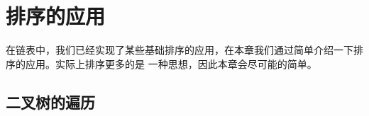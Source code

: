 \documentclass[../../main.tex]{subfiles}
\begin{document}
\setchapterpreamble[u]{\margintoc}

\chapter{排序的应用}

在链表中，我们已经实现了某些基础排序的应用，在本章我们通过简单介绍一下排序的应用。实际上排序更多的是
一种思想，因此本章会尽可能的简单。

\section{二叉树的遍历}
\end{document}
